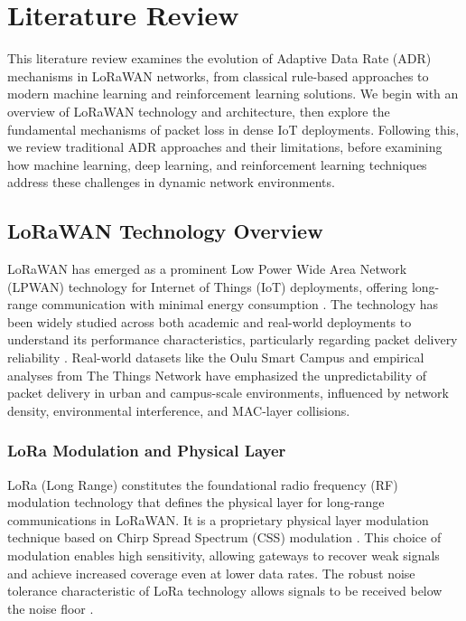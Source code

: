 \documentclass[12pt,a4paper]{article}
\begin{document}
\section{Literature Review}

This literature review examines the evolution of Adaptive Data Rate (ADR) mechanisms in LoRaWAN networks, from classical rule-based approaches to modern machine learning and reinforcement learning solutions. We begin with an overview of LoRaWAN technology and architecture, then explore the fundamental mechanisms of packet loss in dense IoT deployments. Following this, we review traditional ADR approaches and their limitations, before examining how machine learning, deep learning, and reinforcement learning techniques address these challenges in dynamic network environments.

\subsection{LoRaWAN Technology Overview}

LoRaWAN has emerged as a prominent Low Power Wide Area Network (LPWAN) technology for Internet of Things (IoT) deployments, offering long-range communication with minimal energy consumption \cite{Raza17, Augustin16}. The technology has been widely studied across both academic and real-world deployments to understand its performance characteristics, particularly regarding packet delivery reliability \cite{Liu-characterizing, Blenn-lorawan-in-the-wild}. Real-world datasets like the Oulu Smart Campus \cite{Eldeeb-lorawan} and empirical analyses from The Things Network have emphasized the unpredictability of packet delivery in urban and campus-scale environments, influenced by network density, environmental interference, and MAC-layer collisions.

\subsubsection{LoRa Modulation and Physical Layer}

LoRa (Long Range) constitutes the foundational radio frequency (RF) modulation technology that defines the physical layer for long-range communications in LoRaWAN. It is a proprietary physical layer modulation technique based on Chirp Spread Spectrum (CSS) modulation \cite{Augustin16}. This choice of modulation enables high sensitivity, allowing gateways to recover weak signals and achieve increased coverage even at lower data rates. The robust noise tolerance characteristic of LoRa technology allows signals to be received below the noise floor \cite{Ruan2025_LoRa_Localization}.
\end{document}
